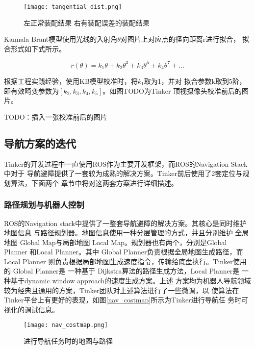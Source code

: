 \begin{figure}[h] %
  \centering
  \texttt{[image: tangential\_dist.png]}
  \caption{左正常装配结果 右有装配误差的装配结果}
  \label{fig:tangential_distort}
\end{figure}

Kannala Brant模型使用光线的入射角$\theta$对图片上对应点的径向距离r进行拟合，
拟合形式如下式所示。

\begin{equation}
  r(\theta) = k_1\theta + k_2\theta^{3} + k_3\theta^{5} + k_4\theta^{7} + ...
\end{equation}

根据工程实践经验，使用KB模型校准时，将$k_1$取为1，并对
拟合参数{k}取到5阶，即有效畸变参数为$[k_2, k_3, k_4, k_5]$。如图TODO为Tinker
顶视摄像头校准前后的图片。

TODO：插入一张校准前后的图片


\subsection{导航方案的迭代}

Tinker的开发过程中一直使用ROS作为主要开发框架，而ROS的Navigation Stack中对于
导航避障提供了一套较为成熟的解决方案。Tinker前后使用了2套定位与规划算法，下面两个
章节中将对这两套方案进行详细描述。

\subsubsection{路径规划与机器人控制}

ROS的Navigation stack中提供了一整套导航避障的解决方案。其核心是同时维护地图信息
与路径规划器。地图信息使用一种分层管理的方式\cite{lu2014layered}，并且分别维护
全局地图 Global Map与局部地图 Local Map。规划器也有两个，分别是Global Planner
和Local Planner。其中 Global Planner负责根据全局地图生成路径，而 Local Planner
则负责根据局部地图生成速度指令，传输给底盘执行。Tinker使用的 Global Planner是
一种基于 Dijkstra算法\cite{deng2012fuzzy}的路径生成方法，Local Planner是
一种基于dynamic window approach的速度生成方案\cite{fox1997dynamic}。上述
方案均为机器人导航领域较为经典且通用的方案，Tinker团队对上述算法进行了一些微调，以
使算法在Tinker平台上有更好的表现，如图\ref{nav_costmap}所示为Tinker进行导航任
务时可视化的调试信息。

\begin{figure}[h] %
  \centering
  \texttt{[image: nav\_costmap.png]}
  \caption{进行导航任务时的地图与路径}
  \label{fig:nav_costmap}
\end{figure}


